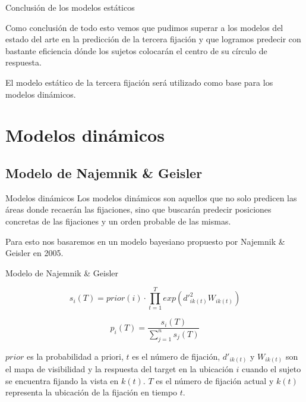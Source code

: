 \documentclass[compress]{beamer}
\begin{document}
\begin{frame}{Conclusión de los modelos estáticos}

Como conclusión de todo esto vemos que pudimos superar a los modelos del estado del arte en la predicción de la tercera fijación y que logramos predecir con bastante eficiencia dónde los sujetos colocarán el centro de su círculo de respuesta.
\bigskip

El modelo estático de la tercera fijación será utilizado como base para los modelos dinámicos.
\end{frame}

\section{Modelos dinámicos}
\subsection{Modelo de Najemnik \& Geisler}
\begin{frame}{Modelos dinámicos}
Los modelos dinámicos son aquellos que no solo predicen las áreas donde
recaerán las fijaciones, sino que buscarán predecir posiciones concretas de las fijaciones y un orden probable de las mismas.

\bigskip

Para esto nos basaremos en un modelo bayesiano propuesto por Najemnik \& Geisler en 2005. 
\end{frame}

\begin{frame}{Modelo de Najemnik \& Geisler}

$$s_{i}(T) = prior(i) \cdot \prod_{t=1}^T exp\left(d'^2_{ik(t)} W_{ik(t)}\right)$$

$$p_i(T) = \displaystyle\frac{s_i(T)}{\sum_{j=1}^n s_j(T)}$$

\bigskip
$prior$ es la probabilidad a priori, $t$ es el número de fijación, $d'_{ik(t)}$ y $W_{ik(t)}$ son el mapa de visibilidad y la respuesta del target en la ubicación $i$ cuando el sujeto se encuentra fijando la vista en $k(t)$. $T$ es el número de fijación actual y $k(t)$ representa la ubicación de la fijación en tiempo $t$.

\end{frame}
\end{document}
